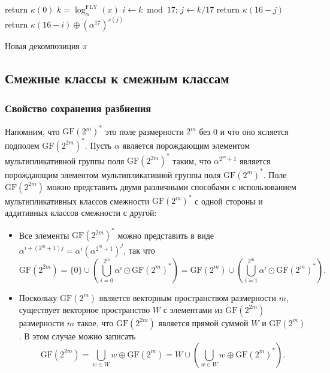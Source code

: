 \begin{algorithm}[htp!]
     {
      return $\kappa(0)$\;
    }{
      $k = \log_{\alpha}^{\text{FLY}}(x)$\;
      $i \gets k \bmod 17$; \quad $j \gets k/17 $ 
       { 
        return $\kappa(16 - j)$ 
      }{
        return $\kappa(16 - i) \oplus (\alpha^{17})^{s(j)}$ 
      }
    }
  \caption{Новая декомпозиция \(\pi\)}
  \label{alg:alg01}
\end{algorithm}

\subsection{Смежные классы к смежным классам}

\subsubsection{Свойство сохранения разбиения}

Напомним, что \(\mathrm{GF}(2^m)^*\) это поле размерности \(2^m\) без 0 и что оно ясляется подполем \(\mathrm{GF}(2^{2m})^*\). Пусть \(\alpha\) является порождающим элементом мультипликативной группы поля \(\mathrm{GF}(2^{2m})^*\) таким, что \(\alpha^{2^m+1}\) является порождающим элементом мультипликативной группы поля \(\mathrm{GF}(2^m)^*\). Поле \(\mathrm{GF}(2^{2m})\) можно представить двумя различными способами с использованием мультипликативных классов смежности \(\mathrm{GF}(2^m)^*\) с одной стороны и аддитивных классов смежности с другой:

\begin{itemize}
  \item Все элементы \(\mathrm{GF}(2^{2m})^*\) можно представить в виде \(\alpha^{i+(2^m+1)j} = \alpha^i (\alpha^{2^m+1})^j\), так что
  \[
  \mathrm{GF}(2^{2m}) = \{0\} \cup \left(\bigcup_{i=0}^{2^m} \alpha^i \odot \mathrm{GF}(2^m)^*\right) = \mathrm{GF}(2^m) \cup \left(\bigcup_{i=1}^{2^m} \alpha^i \odot \mathrm{GF}(2^m)^*\right).
  \]
  \item Поскольку \(\mathrm{GF}(2^m)\) является векторным пространством размерности \(m\), существует векторное пространство \(W\) с элементами из \(\mathrm{GF}(2^{2m})\) размерности \(m\) такое, что \(\mathrm{GF}(2^{2m})\) является прямой суммой \(W\) и \(\mathrm{GF}(2^m)\). В этом случае можно записать
  \[
  \mathrm{GF}(2^{2m}) = \bigcup_{w \in W} w \oplus \mathrm{GF}(2^m) = W \cup \left(\bigcup_{w \in W} w \oplus \mathrm{GF}(2^m)^*\right).
  \]
\end{itemize}

